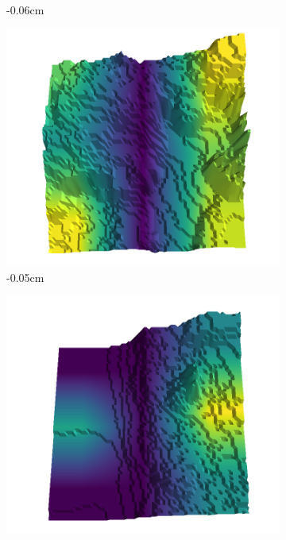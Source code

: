 \documentclass[../document.tex]{subfiles}
\begin{document}
\begin{figure}[H]
\begin{subfigure}[b]{0.242\linewidth}
    \caption{-0.06cm}
    \end{subfigure}
    \begin{subfigure}[b]{0.242\linewidth}
    \includegraphics[width=\linewidth]{../img/5/quarry/worst/00-patch-3d-majavi-colormap-30.png}
    \caption{-0.05cm}
    \end{subfigure}
    \begin{subfigure}[b]{0.242\linewidth}
    \includegraphics[width=\linewidth]{../img/5/quarry/worst/00-patch-3d-majavi-colormap-35.png}

\end{subfigure}
\end{figure}
\end{document}
